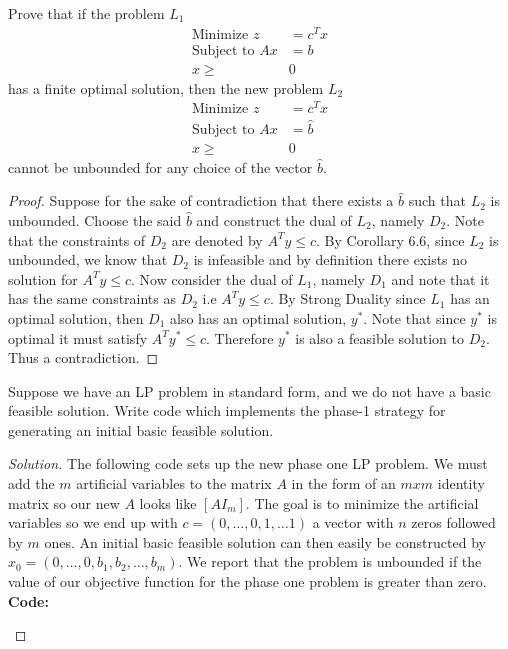 \documentclass[12pt]{article}
\makeatletter
\theoremstyle{homework}
\newenvironment{exercise}[1]
{\def\@currentlabel{#1}\exercisecore}
{\endexercisecore}
\makeatother
\begin{document}
\begin{exercise}{2.11} Prove that if the problem $L_1$
  \begin{align*}
    \text{Minimize } z &= c^Tx\\
    \text{Subject to } Ax &= b\\
    x \geq &0
  \end{align*}
  has a finite optimal solution, then the new problem $L_2$
  \begin{align*}
    \text{Minimize } z &= c^Tx\\
    \text{Subject to } Ax &= \hat{b}\\
    x \geq &0
  \end{align*}
  cannot be unbounded for any choice of the vector $\hat{b}$.
  \begin{proof} Suppose for the sake of contradiction that there exists a $\hat{b}$ such that $L_2$ is unbounded. 
    Choose the said $\hat{b}$ and construct the dual of $L_2$, namely $D_2$. Note that the constraints of $D_2$ are denoted by 
    $A^Ty \leq c$. By Corollary 6.6, since $L_2$ is unbounded, we know that $D_2$ is infeasible and by definition there exists no solution for
    $A^Ty \leq c$. Now consider the dual of $L_1$, namely $D_1$ and note that it has the same constraints as $D_2$ i.e  $A^Ty \leq c$. By Strong Duality 
    since $L_1$ has an optimal solution, then $D_1$ also has an optimal solution, $y^*$. Note that since $y^*$ is optimal it must satisfy $A^Ty^* \leq c$. Therefore 
    $y^*$ is also a feasible solution to $D_2$. Thus a contradiction.  
 \end{proof}
\end{exercise}
\vspace{.5in}



\begin{exercise}{Problem P10} Suppose we have an LP problem in standard form, and we do not have a basic feasible solution. 
  Write code which implements the phase-1 strategy for generating an initial basic feasible solution.  
  \begin{proof}[Solution] The following code sets up the new phase one LP problem. We must add the $m$ artificial variables to 
    the matrix $A$ in the form of an $mxm$ identity matrix so our new $A$ looks like $[A I_m]$. The goal is to minimize the artificial variables 
    so we end up with $c = (0, \dots, 0, 1, \dots 1)$ a vector with $n$ zeros followed  by $m$ ones. An initial basic feasible solution can then easily be 
    constructed by $x_0 =(0, \dots, 0, b_1, b_2, \dots, b_m)$. We report that the problem is unbounded if the value of our objective function for the phase one problem 
    is greater than zero.\\
    \textbf{Code:}
    \begin{center}
      
    \end{center}
 \end{proof}
\end{exercise}
\vspace{.5in}
\end{document}
